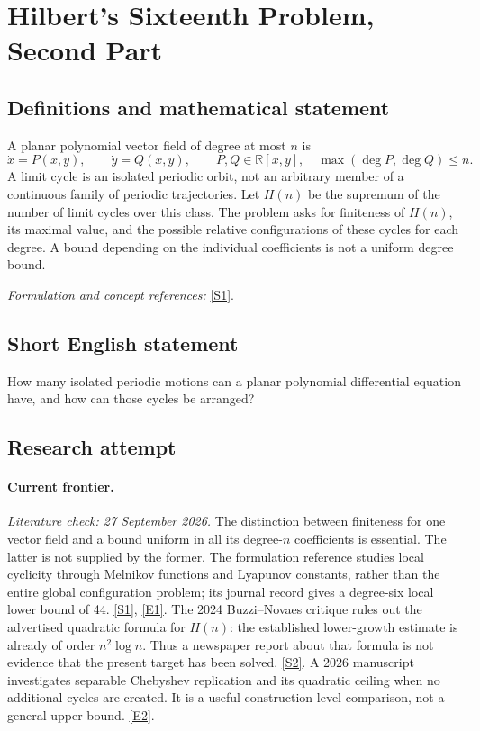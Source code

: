 \documentclass[11pt,a4paper]{article}
\newcommand{\R}{\mathbb{R}}
\newcommand{\sref}[2]{\hyperlink{source:#1:#2}{[S#2]}}
\newcommand{\eref}[2]{\hyperlink{extra:#1:#2}{[E#2]}}
\newif\ifshowcatalogue
\newcommand{\cataloguescope}[1]{\ifshowcatalogue
 \paragraph{Exact scope in the supplied catalogue.}
 \begin{quote}\small #1\end{quote}\fi}
\numberwithin{equation}{section}
\begin{document}
\setcounter{section}{39}
\clearpage
\section{\texorpdfstring{Hilbert's Sixteenth Problem, Second Part}{Hilbert's Sixteenth Problem, Second Part}}\label{40}
\subsection{Definitions and mathematical statement}
A planar polynomial vector field of degree at most $n$ is
\[
 \dot x=P(x,y),\qquad\dot y=Q(x,y),\qquad P,Q\in\R[x,y],\quad\max(\deg P,\deg Q)\le n.
\]
A limit cycle is an isolated periodic orbit, not an arbitrary member of a continuous family of periodic trajectories. Let $H(n)$ be the supremum of the number of limit cycles over this class. The problem asks for finiteness of $H(n)$, its maximal value, and the possible relative configurations of these cycles for each degree. A bound depending on the individual coefficients is not a uniform degree bound.
\par\smallskip\textit{Formulation and concept references:} \sref{40}{1}.
\cataloguescope{For every degree n >= 2, prove finiteness and determine the maximal number and possible configurations of limit cycles of planar polynomial vector fields of degree n.}
\subsection{Short English statement}
How many isolated periodic motions can a planar polynomial differential equation have, and how can those cycles be arranged?
\subsection{Research attempt}
\paragraph{Current frontier.}
\textit{Literature check: 27 September 2026.}
The distinction between finiteness for one vector field and a bound uniform
in all its degree-$n$ coefficients is essential. The latter is not supplied
by the former. The formulation reference studies local cyclicity through
Melnikov functions and Lyapunov constants, rather than the entire global
configuration problem; its journal record gives a degree-six local lower
bound of 44. \sref{40}{1}, \eref{40}{1}.
The 2024 Buzzi--Novaes critique rules out the advertised quadratic formula
for $H(n)$: the established lower-growth estimate is already of order
$n^2\log n$. Thus a newspaper report about that formula is not evidence
that the present target has been solved. \sref{40}{2}.
A 2026 manuscript investigates separable Chebyshev replication and its
quadratic ceiling when no additional cycles are created. It is a useful
construction-level comparison, not a general upper bound. \eref{40}{2}.
\end{document}
